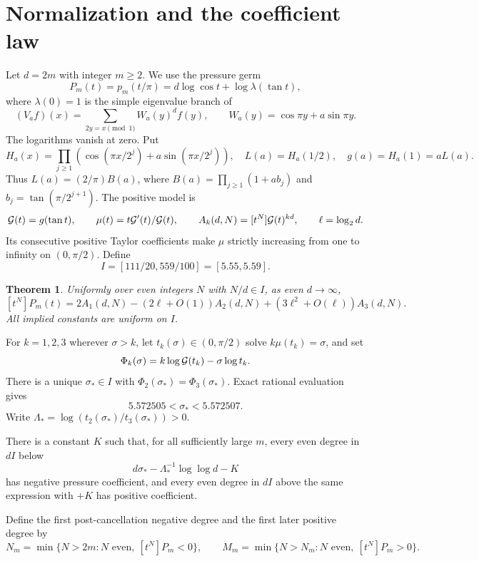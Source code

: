 \documentclass[11pt,a4paper]{article}
\newtheorem{theorem}{Theorem}[section]\newtheorem{lemma}[theorem]{Lemma}
\begin{document}
\section{Normalization and the coefficient law}
Let $d=2m$ with integer $m\ge2$. We use the pressure germ
\begin{equation}\label{eq:pressure}
 P_m(t)=p_m(t/\pi)=d\log\cos t+\log\lambda(\tan t),
\end{equation}
where $\lambda(0)=1$ is the simple eigenvalue branch of
\[
 (V_af)(x)=\sum_{2y=x\pmod1}W_a(y)^d f(y),\qquad W_a(y)=\cos\pi y+a\sin\pi y.
\]
The logarithms vanish at zero. Put
\[
 H_a(x)=\prod_{j\ge1}(\cos(\pi x/2^j)+a\sin(\pi x/2^j)),
 \quad L(a)=H_a(1/2),\quad g(a)=H_a(1)=aL(a).
\]
Thus $L(a)=(2/\pi)B(a)$, where
$B(a)=\prod_{j\ge1}(1+ab_j)$ and $b_j=\tan(\pi/2^{j+1})$.
The positive model is
\[
 \mathcal G(t)=g(\tan t),\qquad
 \mu(t)=t\mathcal G'(t)/\mathcal G(t),\qquad
 A_k(d,N)=[t^N]\mathcal G(t)^{kd},\qquad \ell=\log_2d.
\]
Its consecutive positive Taylor coefficients make $\mu$ strictly increasing from one to infinity on $(0,\pi/2)$. Define
\[
 I=[111/20,559/100]=[5.55,5.59].
\]
\begin{theorem}\label{thm:law}
Uniformly over even integers $N$ with $N/d\in I$, as even $d\to\infty$,
\begin{equation}\label{eq:law}
 [t^N]P_m(t)
 =2A_1(d,N)-(2\ell+O(1))A_2(d,N)
                  +(3\ell^2+O(\ell))A_3(d,N).
\end{equation}
All implied constants are uniform on $I$.
\end{theorem}
For $k=1,2,3$ wherever $\sigma>k$, let $t_k(\sigma)\in(0,\pi/2)$ solve $k\mu(t_k)=\sigma$, and set
\[
 \Phi_k(\sigma)=k\log\mathcal G(t_k)-\sigma\log t_k.
\]
There is a unique $\sigma_*\in I$ with $\Phi_2(\sigma_*)=\Phi_3(\sigma_*)$. Exact rational evaluation gives
\begin{equation}\label{eq:crossbracket}
 5.572505<\sigma_*<5.572507.
\end{equation}
Write $\Lambda_* =\log(t_2(\sigma_*)/t_3(\sigma_*))>0$.
\begin{corollary}\label{cor:cross}
There is a constant $K$ such that, for all sufficiently large $m$, every even degree in $dI$ below
\[
 d\sigma_*-\Lambda_*^{-1}\log\log d-K
\]
has negative pressure coefficient, and every even degree in $dI$ above the same expression with $+K$ has positive coefficient.
\end{corollary}
Define the first post-cancellation negative degree and the first later positive degree by
\[
 N_m=\min\{N>2m:N\text{ even},\ [t^N]P_m<0\},\qquad
 M_m=\min\{N>N_m:N\text{ even},\ [t^N]P_m>0\}.
\]
\end{document}
